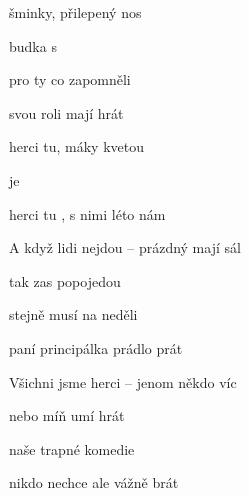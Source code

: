 
\zs
{} šminky, přilepený nos

budka s 

 pro ty co zapomněli

 svou roli mají  hrát
\ks
\zr

 herci tu, máky kvetou

 je

 herci tu , s nimi léto  nám
\kr
\zs

A když lidi nejdou -- prázdný mají sál

tak zas popojedou

stejně musí na neděli

paní principálka prádlo prát

\ks
\zr   \kr
\zs


Všichni jsme herci -- jenom někdo víc

nebo míň umí hrát

naše trapné komedie

nikdo nechce ale vážně brát
\ks

\zr
\kr

\kp

